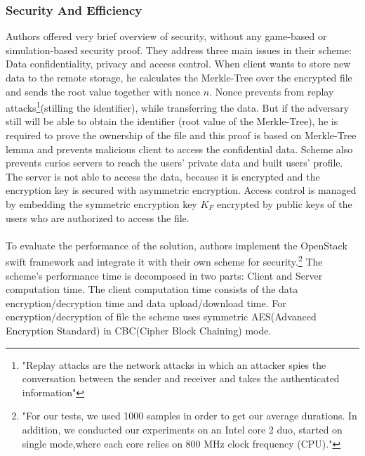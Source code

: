 \documentclass[12pt]{article}
\begin{document}
\subsubsection{Security And Efficiency}
\label{subsub:secAndeff5}
Authors offered very brief overview of security, without any game-based or simulation-based security proof. They address three main issues in their scheme: Data confidentiality, privacy and access control.  When client wants to store new data to the remote storage, he calculates the Merkle-Tree  over the encrypted file and sends the root value together with nonce $n$. Nonce  prevents from replay attacks\footnote{"Replay attacks are the network attacks in which an attacker spies the conversation between the sender and receiver and takes the authenticated information"}(stilling the identifier), while transferring the data. But if the adversary still will be able to obtain the identifier (root value of the Merkle-Tree), he is required to prove the ownership of the file and this proof is based on Merkle-Tree lemma \cite{MerkleLemma} and prevents malicious client to access the confidential data. Scheme also prevents curios  servers to reach  the users' private data and built users' profile. The server is not able to access the data, because it is encrypted and the encryption key is secured with asymmetric encryption. Access control is managed by embedding the symmetric encryption key $K_F$ encrypted by public keys of the users who are authorized to access the file.\\\\
To evaluate the performance of the solution, authors implement the OpenStack swift framework and integrate it with their own scheme for security.\footnote{"For our tests, we used 1000 samples in order to get our average durations. In addition, we conducted our experiments on an Intel core 2 duo, started on single mode,where each core relies on 800 MHz clock frequency (CPU).\cite{CovergentEnc}"} The scheme's performance time is decomposed in two parts: Client and Server computation time. The client computation time consists of the data encryption/decryption time and data upload/download time. For encryption/decryption of file the scheme uses symmetric AES(Advanced Encryption Standard) in CBC(Cipher Block Chaining) mode.
\end{document}
